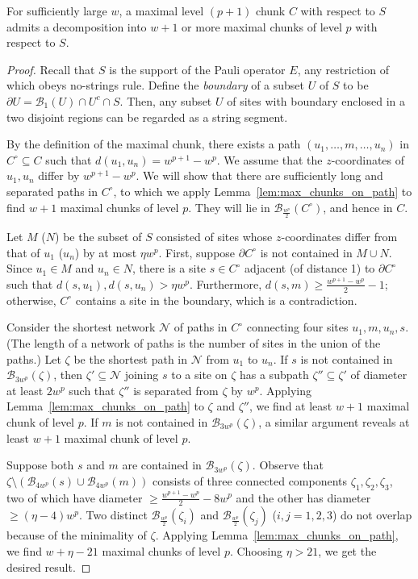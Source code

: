 \begin{lem}
For sufficiently large $w$,
a maximal level $(p+1)$ chunk $C$ with respect to $S$
admits a decomposition into $w+1$ or more maximal chunks of level $p$ with respect to $S$.
\label{lem:many_max_in_max}
\end{lem}
\begin{proof}
Recall that $S$ is the support of the Pauli operator $E$, any restriction of which obeys no-strings rule.
Define the \emph{boundary} of a subset $U$ of $S$ to be $\partial U = \mathcal B_1(U) \cap U^c \cap S$.
Then, any subset $U$ of sites with boundary enclosed in a two disjoint regions can be regarded as a string segment.

By the definition of the maximal chunk,
there exists a path $(u_1,\ldots,m,\ldots,u_n)$ in $C^\circ \subseteq C$ such that $d(u_1,u_n)=w^{p+1}-w^p$.
We assume that the $z$-coordinates of $u_1, u_n$ differ by $w^{p+1}-w^p$.
We will show that there are sufficiently long and separated paths in $C^\circ$,
to which we apply Lemma~\ref{lem:max_chunks_on_path} to find $w+1$ maximal chunks of level $p$.
They will lie in $\mathcal B_\frac{w^p}{2}(C^\circ)$, and hence in $C$.

Let $M$ ($N$) be the subset of $S$ consisted of sites
whose $z$-coordinates differ from that of $u_1$ ($u_n$) by at most $\eta w^p$.
First, suppose $\partial C^\circ$ is not contained in $M \cup N$.
Since $u_1 \in M$ and $u_n \in N$, there is a site $s \in C^\circ$
adjacent (of distance 1) to $\partial C^\circ$ such that $d(s,u_1),d(s,u_n) > \eta w^p$.
Furthermore, $d(s,m) \ge \frac{w^{p+1}-w^p}{2}-1$;
otherwise, $C^\circ$ contains a site in the boundary, which is a contradiction.

Consider the shortest network $\mathcal{N}$ of paths in $C^\circ$ connecting four sites $u_1,m,u_n,s$.
(The length of a network of paths is the number of sites in the union of the paths.)
Let $\zeta$ be the shortest path in $\mathcal{N}$ from $u_1$ to $u_n$.
If $s$ is not contained in $\mathcal B_{3w^p}(\zeta)$,
then $\zeta' \subseteq \mathcal{N}$ joining $s$ to a site on $\zeta$
has a subpath $\zeta'' \subseteq \zeta'$ of diameter at least $2w^p$
such that $\zeta''$ is separated from $\zeta$ by $w^p$.
Applying Lemma~\ref{lem:max_chunks_on_path} to $\zeta$ and $\zeta''$,
we find at least $w+1$ maximal chunk of level $p$.
If $m$ is not contained in $\mathcal B_{3w^p}(\zeta)$,
a similar argument reveals at least $w+1$ maximal chunk of level $p$.

Suppose both $s$ and $m$ are contained in $\mathcal B_{3w^p}(\zeta)$.
Observe that $\zeta \setminus ( \mathcal B_{4w^p}(s) \cup \mathcal B_{4w^p}(m) )$
consists of three connected components $\zeta_1,\zeta_2,\zeta_3$,
two of which have diameter $\ge \frac{w^{p+1}-w^p}{2}-8w^p$ and the other has diameter $\ge (\eta - 4)w^p$.
Two distinct $\mathcal B_{\frac{w^p}{2}}(\zeta_i)$ and $\mathcal B_{\frac{w^p}{2}}(\zeta_j)$ ($i,j=1,2,3$)
do not overlap because of the minimality of $\zeta$. Applying Lemma~\ref{lem:max_chunks_on_path},
we find $w + \eta - 21$ maximal chunks of level $p$.
Choosing $\eta > 21$, we get the desired result.


\end{proof}
